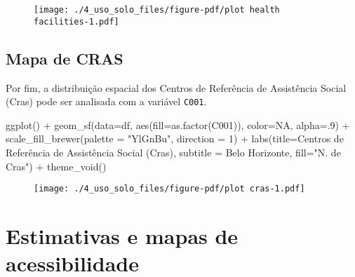 \documentclass[
  letterpaper,
  DIV=11,
  numbers=noendperiod]{scrreprt}
\newenvironment{Shaded}{\begin{snugshade}}{\end{snugshade}}
\newcommand{\AttributeTok}[1]{\textcolor[rgb]{0.40,0.45,0.13}{#1}}
\newcommand{\ConstantTok}[1]{\textcolor[rgb]{0.56,0.35,0.01}{#1}}
\newcommand{\DecValTok}[1]{\textcolor[rgb]{0.68,0.00,0.00}{#1}}
\newcommand{\FunctionTok}[1]{\textcolor[rgb]{0.28,0.35,0.67}{#1}}
\newcommand{\NormalTok}[1]{\textcolor[rgb]{0.00,0.23,0.31}{#1}}
\newcommand{\SpecialCharTok}[1]{\textcolor[rgb]{0.37,0.37,0.37}{#1}}
\newcommand{\StringTok}[1]{\textcolor[rgb]{0.13,0.47,0.30}{#1}}
\begin{document}
\begin{figure}[H]

{\centering \texttt{[image: ./4\_uso\_solo\_files/figure-pdf/plot health facilities-1.pdf]}

}

\end{figure}

\hypertarget{mapa-de-cras}{%
\section{Mapa de CRAS}\label{mapa-de-cras}}

Por fim, a distribuição espacial dos Centros de Referência de
Assistência Social (Cras) pode ser analisada com a variável
\texttt{C001}.

\begin{Shaded}
\begin{Highlighting}[]
\FunctionTok{ggplot}\NormalTok{() }\SpecialCharTok{+}
  \FunctionTok{geom\_sf}\NormalTok{(}\AttributeTok{data=}\NormalTok{df, }\FunctionTok{aes}\NormalTok{(}\AttributeTok{fill=}\FunctionTok{as.factor}\NormalTok{(C001)), }\AttributeTok{color=}\ConstantTok{NA}\NormalTok{, }\AttributeTok{alpha=}\NormalTok{.}\DecValTok{9}\NormalTok{) }\SpecialCharTok{+}
   \FunctionTok{scale\_fill\_brewer}\NormalTok{(}\AttributeTok{palette =} \StringTok{"YlGnBu"}\NormalTok{, }\AttributeTok{direction =} \DecValTok{1}\NormalTok{) }\SpecialCharTok{+}
  \FunctionTok{labs}\NormalTok{(}\AttributeTok{title=}\StringTok{\textquotesingle{}Centros de Referência de Assistência Social (Cras)\textquotesingle{}}\NormalTok{, }
       \AttributeTok{subtitle =} \StringTok{\textquotesingle{}Belo Horizonte\textquotesingle{}}\NormalTok{, }\AttributeTok{fill=}\StringTok{"N. de Cras"}\NormalTok{) }\SpecialCharTok{+}
  \FunctionTok{theme\_void}\NormalTok{()}
\end{Highlighting}
\end{Shaded}

\begin{figure}[H]

{\centering \texttt{[image: ./4\_uso\_solo\_files/figure-pdf/plot cras-1.pdf]}

}

\end{figure}

\hypertarget{estimativas-e-mapas-de-acessibilidade}{%
\chapter{Estimativas e mapas de
acessibilidade}\label{estimativas-e-mapas-de-acessibilidade}}
\end{document}
